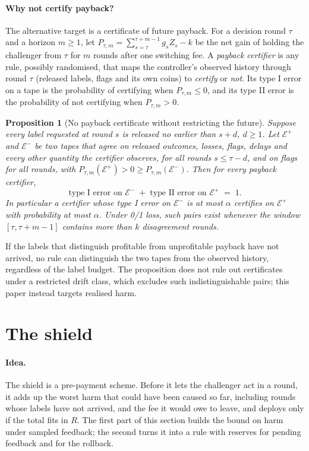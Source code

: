 \documentclass[10pt]{article}
\theoremstyle{plain}
\newtheorem{proposition}{Proposition}
\theoremstyle{definition}
\begin{document}
\paragraph{Why not certify payback?}
The alternative target is a certificate of future payback. For a decision round $\tau$ and a horizon $m\ge1$, let $P_{\tau,m}=\sum_{s=\tau}^{\tau+m-1}g_sZ_s-k$ be the net gain of holding the challenger from $\tau$ for $m$ rounds after one switching fee. A \emph{payback certifier} is any rule, possibly randomised, that maps the controller's observed history through round $\tau$ (released labels, flags and its own coins) to \emph{certify} or \emph{not}. Its type I error on a tape is the probability of certifying when $P_{\tau,m}\le0$, and its type II error is the probability of not certifying when $P_{\tau,m}>0$.

\begin{samepage}
\begin{proposition}[No payback certificate without restricting the future]\label{prop:nocert}
Suppose every label requested at round $s$ is released no earlier than $s+d$, $d\ge1$. Let $\mathcal E^+$ and $\mathcal E^-$ be two tapes that agree on released outcomes, losses, flags, delays and every other quantity the certifier observes, for all rounds $s\le\tau-d$, and on flags for all rounds, with $P_{\tau,m}(\mathcal E^+)>0\ge P_{\tau,m}(\mathcal E^-)$. Then for every payback certifier,
\[
\text{type I error on }\mathcal E^-\;+\;\text{type II error on }\mathcal E^+\;=\;1 .
\]
In particular a certifier whose type I error on $\mathcal E^-$ is at most $\alpha$ certifies on $\mathcal E^+$ with probability at most $\alpha$. Under 0/1 loss, such pairs exist whenever the window $[\tau,\tau+m-1]$ contains more than $k$ disagreement rounds.
\end{proposition}
\end{samepage}
If the labels that distinguish profitable from unprofitable payback have not arrived, no rule can distinguish the two tapes from the observed history, regardless of the label budget. The proposition does not rule out certificates under a restricted drift class, which excludes such indistinguishable pairs; this paper instead targets realised harm.

\section{The shield}\label{sec:method}
\paragraph{Idea.}
The shield is a pre-payment scheme. Before it lets the challenger act in a round, it adds up the worst harm that could have been caused so far, including rounds whose labels have not arrived, and the fee it would owe to leave, and deploys only if the total fits in $R$. The first part of this section builds the bound on harm under sampled feedback; the second turns it into a rule with reserves for pending feedback and for the rollback.
\end{document}
